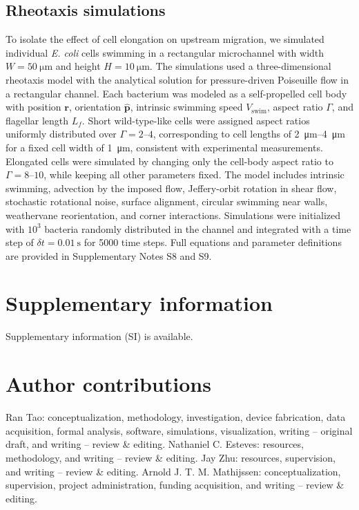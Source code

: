 \documentclass[twoside,twocolumn,9pt]{article}
\begin{document}
    \subsection*{Rheotaxis simulations}
    To isolate the effect of cell elongation on upstream migration, we simulated individual \textit{E. coli} cells swimming in a rectangular microchannel with width \(W=\SI{50}{\micro\meter}\) and height \(H=\SI{10}{\micro\meter}\). The simulations used a three-dimensional rheotaxis model with the analytical solution for pressure-driven Poiseuille flow in a rectangular channel. Each bacterium was modeled as a self-propelled cell body with position \(\mathbf{r}\), orientation \(\hat{\mathbf{p}}\), intrinsic swimming speed \(V_{\mathrm{swim}}\), aspect ratio \(\Gamma\), and flagellar length \(L_f\). Short wild-type-like cells were assigned aspect ratios uniformly distributed over \(\Gamma=2\text{--}4\), corresponding to cell lengths of \SI{2}{\micro\meter}--\SI{4}{\micro\meter} for a fixed cell width of \SI{1}{\micro\meter}, consistent with experimental measurements. Elongated cells were simulated by changing only the cell-body aspect ratio to \(\Gamma=8\text{--}10\), while keeping all other parameters fixed. The model includes intrinsic swimming, advection by the imposed flow, Jeffery-orbit rotation in shear flow, stochastic rotational noise, surface alignment, circular swimming near walls, weathervane reorientation, and corner interactions. Simulations were initialized with \(10^3\) bacteria randomly distributed in the channel and integrated with a time step of \(\delta t=\SI{0.01}{\second}\) for 5000 time steps. Full equations and parameter definitions are provided in Supplementary Notes S8 and S9.

\section*{Supplementary information}

Supplementary information (SI) is available.

\section*{Author contributions}

Ran Tao: conceptualization, methodology, investigation, device fabrication, data acquisition, formal analysis, software, simulations, visualization, writing -- original draft, and writing -- review \& editing. Nathaniel C. Esteves: resources, methodology, and writing -- review \& editing. Jay Zhu: resources, supervision, and writing -- review \& editing. Arnold J. T. M. Mathijssen: conceptualization, supervision, project administration, funding acquisition, and writing -- review \& editing.
\end{document}
